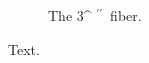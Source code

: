 \documentclass{article}
\def\arcs{\ifmmode ^{\prime\prime} \else $^{\prime\prime}$}
\begin{document}
\begin{figure}
\caption{The 3\arcs\ fiber.}
\label{f:a}
\end{figure}
Text.
\end{document}
